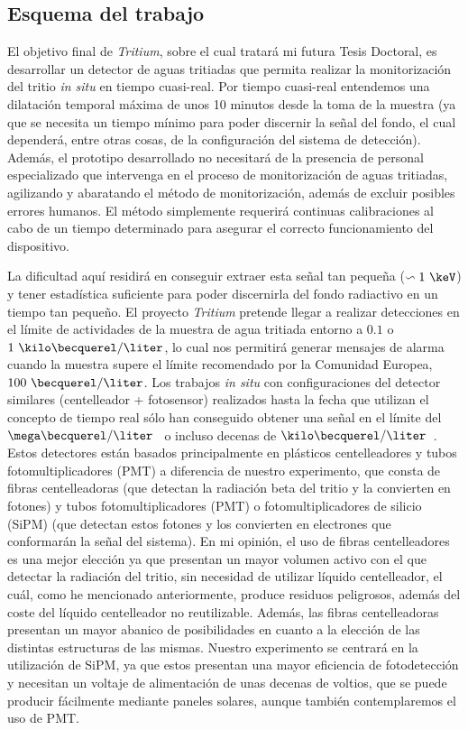 \subsection{Esquema del trabajo}

El objetivo final de \textit{Tritium}, sobre el cual tratará mi futura Tesis Doctoral, es desarrollar un detector de aguas tritiadas que permita realizar la monitorización del tritio \textit{in situ} en tiempo cuasi-real. Por tiempo cuasi-real entendemos una dilatación temporal máxima de unos 10 minutos desde la toma de la muestra (ya que se necesita un tiempo mínimo para poder discernir la señal del fondo, el cual dependerá, entre otras cosas, de la configuración del sistema de detección). Además, el prototipo desarrollado no necesitará de la presencia de personal especializado que intervenga en el proceso de monitorización de aguas tritiadas, agilizando y abaratando el método de monitorización, además de excluir posibles errores humanos. El método simplemente requerirá continuas calibraciones al cabo de un tiempo determinado para asegurar el correcto funcionamiento del dispositivo. 

La dificultad aquí residirá en conseguir extraer esta señal tan pequeña ($\backsim 1~\keV$) y tener estadística suficiente para poder discernirla del fondo radiactivo en un tiempo tan pequeño. El proyecto \textit{Tritium} pretende llegar a realizar detecciones en el límite de actividades de la muestra de agua tritiada entorno a $0.1$ o $1~\kilo\becquerel/\liter$, lo cual nos permitirá generar mensajes de alarma cuando la muestra supere el límite recomendado por la Comunidad Europea, $100~\becquerel/\liter$. Los trabajos \textit{in situ} con configuraciones del detector similares (centelleador + fotosensor) realizados hasta la fecha que utilizan el concepto de tiempo real sólo han conseguido obtener una señal en el límite del $\mega\becquerel/\liter$~\cite{TesisTritio} o incluso decenas de $\kilo\becquerel/\liter$~\cite{Rat}. Estos detectores están basados principalmente en plásticos centelleadores y tubos fotomultiplicadores (PMT) a diferencia de nuestro experimento, que consta de fibras centelleadoras (que detectan la radiación beta del tritio y la convierten en fotones) y tubos fotomultiplicadores (PMT) o fotomultiplicadores de silicio (SiPM) (que detectan estos fotones y los convierten en electrones que conformarán la señal del sistema). 
En mi opinión, el uso de fibras centelleadores es una mejor elección ya que presentan un mayor volumen activo con el que detectar la radiación del tritio,  sin necesidad de utilizar líquido centelleador, el cuál, como he mencionado anteriormente, produce residuos peligrosos, además del coste del líquido centelleador no reutilizable. Además, las fibras centelleadoras presentan un mayor abanico de posibilidades en cuanto a la elección de las distintas estructuras de las mismas. Nuestro experimento se centrará en la utilización de SiPM, ya que estos presentan una mayor eficiencia de fotodetección y necesitan un voltaje de alimentación de unas decenas de voltios, que se puede producir fácilmente mediante paneles solares, aunque también contemplaremos el uso de PMT. 

